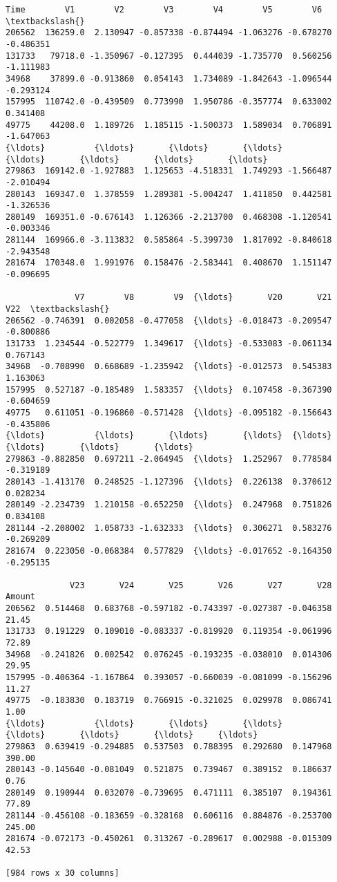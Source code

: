 \documentclass[11pt]{article}
\begin{document}
    \begin{Verbatim}[commandchars=\\\{\}]
            Time        V1        V2        V3        V4        V5        V6  \textbackslash{}
206562  136259.0  2.130947 -0.857338 -0.874494 -1.063276 -0.678270 -0.486351
131733   79718.0 -1.350967 -0.127395  0.444039 -1.735770  0.560256 -1.111983
34968    37899.0 -0.913860  0.054143  1.734089 -1.842643 -1.096544 -0.293124
157995  110742.0 -0.439509  0.773990  1.950786 -0.357774  0.633002  0.341408
49775    44208.0  1.189726  1.185115 -1.500373  1.589034  0.706891 -1.647063
{\ldots}          {\ldots}       {\ldots}       {\ldots}       {\ldots}       {\ldots}       {\ldots}       {\ldots}
279863  169142.0 -1.927883  1.125653 -4.518331  1.749293 -1.566487 -2.010494
280143  169347.0  1.378559  1.289381 -5.004247  1.411850  0.442581 -1.326536
280149  169351.0 -0.676143  1.126366 -2.213700  0.468308 -1.120541 -0.003346
281144  169966.0 -3.113832  0.585864 -5.399730  1.817092 -0.840618 -2.943548
281674  170348.0  1.991976  0.158476 -2.583441  0.408670  1.151147 -0.096695

              V7        V8        V9  {\ldots}       V20       V21       V22  \textbackslash{}
206562 -0.746391  0.002058 -0.477058  {\ldots} -0.018473 -0.209547 -0.800886
131733  1.234544 -0.522779  1.349617  {\ldots} -0.533083 -0.061134  0.767143
34968  -0.708990  0.668689 -1.235942  {\ldots} -0.012573  0.545383  1.163063
157995  0.527187 -0.185489  1.583357  {\ldots}  0.107458 -0.367390 -0.604659
49775   0.611051 -0.196860 -0.571428  {\ldots} -0.095182 -0.156643 -0.435806
{\ldots}          {\ldots}       {\ldots}       {\ldots}  {\ldots}       {\ldots}       {\ldots}       {\ldots}
279863 -0.882850  0.697211 -2.064945  {\ldots}  1.252967  0.778584 -0.319189
280143 -1.413170  0.248525 -1.127396  {\ldots}  0.226138  0.370612  0.028234
280149 -2.234739  1.210158 -0.652250  {\ldots}  0.247968  0.751826  0.834108
281144 -2.208002  1.058733 -1.632333  {\ldots}  0.306271  0.583276 -0.269209
281674  0.223050 -0.068384  0.577829  {\ldots} -0.017652 -0.164350 -0.295135

             V23       V24       V25       V26       V27       V28  Amount
206562  0.514468  0.683768 -0.597182 -0.743397 -0.027387 -0.046358   21.45
131733  0.191229  0.109010 -0.083337 -0.819920  0.119354 -0.061996   72.89
34968  -0.241826  0.002542  0.076245 -0.193235 -0.038010  0.014306   29.95
157995 -0.406364 -1.167864  0.393057 -0.660039 -0.081099 -0.156296   11.27
49775  -0.183830  0.183719  0.766915 -0.321025  0.029978  0.086741    1.00
{\ldots}          {\ldots}       {\ldots}       {\ldots}       {\ldots}       {\ldots}       {\ldots}     {\ldots}
279863  0.639419 -0.294885  0.537503  0.788395  0.292680  0.147968  390.00
280143 -0.145640 -0.081049  0.521875  0.739467  0.389152  0.186637    0.76
280149  0.190944  0.032070 -0.739695  0.471111  0.385107  0.194361   77.89
281144 -0.456108 -0.183659 -0.328168  0.606116  0.884876 -0.253700  245.00
281674 -0.072173 -0.450261  0.313267 -0.289617  0.002988 -0.015309   42.53

[984 rows x 30 columns]
    \end{Verbatim}
\end{document}
